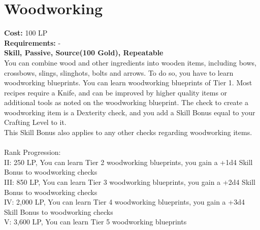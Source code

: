 \section{Woodworking}\label{perk:woodworking}
\textbf{Cost:} 100 LP\\
\textbf{Requirements:} -\\
\textbf{Skill, Passive, Source(100 Gold), Repeatable}\\
You can combine wood and other ingredients into wooden items, including bows, crossbows, slings, slinghots, bolts and arrows.
To do so, you have to learn woodworking blueprints.
You can learn woodworking blueprints of Tier 1.
Most recipes require a Knife, and can be improved by higher quality items or additional tools as noted on the woodworking blueprint.
The check to create a woodworking item is a Dexterity check, and you add a Skill Bonus equal to your Crafting Level to it.\\
This Skill Bonus also applies to any other checks regarding woodworking items.\\
\\
Rank Progression:\\
II: 250 LP, You can learn Tier 2 woodworking blueprints, you gain a +1d4 Skill Bonus to woodworking checks\\
III: 850 LP, You can learn Tier 3 woodworking blueprints, you gain a +2d4 Skill Bonus to woodworking checks\\
IV: 2,000 LP, You can learn Tier 4 woodworking blueprints, you gain a +3d4 Skill Bonus to woodworking checks\\
V: 3,600 LP, You can learn Tier 5 woodworking blueprints\\